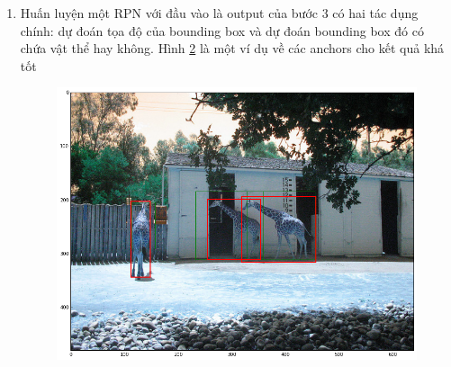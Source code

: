 \begin{enumerate}
\begin{center}
\begin{figure}[H]
    \label{chap2:anchor_9}
    \end{figure}
    \end{center}
    \item Huấn luyện một RPN với đầu vào là output của bước 3 có hai tác dụng chính: dự đoán tọa độ của bounding box và dự đoán bounding box đó có chứa vật thể hay không. Hình \ref{chap2:good_anchor} là một ví dụ về các anchors cho kết quả khá tốt
    \begin{center}
    \begin{figure}[H]
    \centering
    \includegraphics[width=0.7\columnwidth]{images/chap2/index.png}
    \label{chap2:good_anchor}
    \end{figure}
    \end{center}
\end{enumerate}
